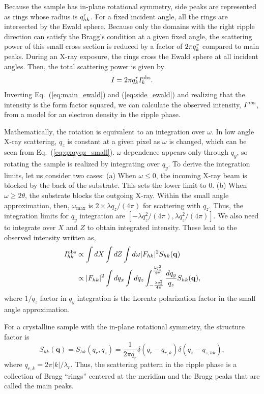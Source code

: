 Because the sample has in-plane rotational symmetry, side peaks are represented as
rings whose radius is $q_{hk}^r$. For a fixed incident
angle, all the rings are intersected by the Ewald sphere. Because only the domains
with the right ripple direction can satisfy the Bragg's condition at a given fixed
angle, the scattering power of this small cross section is reduced by 
a factor of $2\pi q_{k}^r$ compared to main peaks. During 
an X-ray exposure, the rings cross the Ewald sphere
at all incident angles. Then, the total scattering power is given by
\begin{equation}
  I=2\pi q_{k}^r I_{k}^\mathrm{obs}. \label{eq:side_ewald}
\end{equation}
Inverting Eq.~(\ref{eq:main_ewald}) and (\ref{eq:side_ewald}) 
and realizing that the intensity is the form factor
squared, we can calculate the observed intensity, $I_{}^\mathrm{obs}$, 
from a model for an electron density in the ripple phase.

Mathematically, the rotation is  
equivalent to an integration over $\omega$. In low angle X-ray scattering, 
$q_z$ is constant at a given pixel as $\omega$ is changed, which can be seen from 
Eq.~(\ref{eq:qxqyqz_small}). $\omega$ dependence appears only through $q_y$, 
so rotating the sample is realized by integrating over $q_y$. 
To derive the integration limits, let us consider two cases: (a) When $\omega \leq 0$,
the incoming X-ray beam is blocked by the back of the substrate. This sets 
the lower limit to 0. (b) When $\omega \geq 2\theta$, the substrate blocks 
the outgoing X-ray. Within the small angle approximation, then, $\omega_{\text{max}}$
is $2\times \lambda q_z/(4\pi)$ for scattering with $q_z$. 
Thus, the integration limits 
for $q_y$ integration are $[-\lambda q_z^2/(4\pi), \lambda q_z^2/(4\pi)]$.
We also need to integrate over $X$ and $Z$ to obtain integrated intensity. 
These lead to the observed intensity
written as,
\begin{align}
  I_{hk}^\mathrm{obs} 
    &\propto \int dX \int dZ \int d\omega |F_{hk}|^2 S_{hk}(\mathbf{q}) \nonumber \\
    &\propto |F_{hk}|^2 \int dq_x \int dq_z 
             \int_{-\frac{\lambda q_z^2}{4\pi}}^{\frac{\lambda q_z^2}{4\pi}} 
             \frac{dq_y}{q_z} 
             S_{hk}(\mathbf{q}),
\end{align}
where $1/q_z$ factor in $q_y$ integration is the Lorentz polarization factor
in the small angle approximation. 

For a crystalline sample with the in-plane rotational symmetry, the
structure factor is  
\begin{equation}
  S_{hk}(\mathbf{q}) = S_{hk}(q_r,q_z) 
  = \frac{1}{2\pi q_r}\delta(q_r-q_{r,k})\delta(q_z-q_{z,hk}),
\end{equation} 
where $q_{r,k}=2\pi |k|/\lambda_r$. Thus, the scattering pattern in the 
ripple phase is a 
collection of Bragg ``rings'' centered at the meridian and the 
Bragg peaks that are called the main peaks.  

